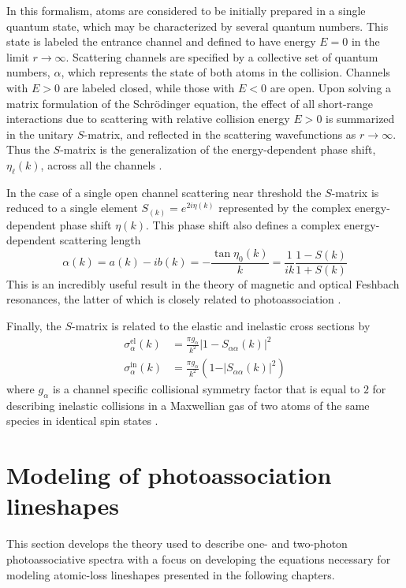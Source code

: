 In this formalism, atoms are considered to be initially prepared in a single quantum state, which may be characterized by several quantum numbers.
This state is labeled the entrance channel and defined to have energy $E=0$ in the limit $r\rightarrow\infty$.
Scattering channels are specified by a collective set of quantum numbers, $\alpha$, which represents the state of both atoms in the collision.
Channels with $E>0$ are labeled closed, while those with $E<0$ are open.
Upon solving a matrix formulation of the Schr\"{o}dinger equation, the effect of all short-range interactions due to scattering with relative collision energy $E > 0$ is summarized in the unitary $S$-matrix, and reflected in the scattering wavefunctions as $r\rightarrow\infty$. 
Thus the $S$-matrix is the generalization of the energy-dependent phase shift, $\eta_{\ell}(k)$, across all the channels \cite{Julienne2009a}.

In the case of a single open channel scattering near threshold the $S$-matrix is reduced to a single element $S_(k)=e^{2i\eta(k)}$ represented by the complex energy-dependent phase shift $\eta(k)$.
This phase shift also defines a complex energy-dependent scattering length
\begin{equation}
	\alpha(k) = a(k) - i b(k) = -\frac{\tan \eta_0(k)}{k} = \frac{1}{ik} \frac{1-S(k)}{1+S(k)}
\end{equation}
This is an incredibly useful result in the theory of magnetic and optical Feshbach resonances, the latter of which is closely related to photoassociation \cite{Chin2010,Nicholson2015a}.

Finally, the $S$-matrix is related to the elastic and inelastic cross sections by \cite{Pachomov2017}
\begingroup
\addtolength{\jot}{1em}
\begin{align}
	\sigma^{\text{el}}_{\alpha}(k) &= \frac{\pi g_{\alpha}}{k^2} \vert 1 - S_{\alpha \alpha}(k) \vert^2 \\
	\label{eq:sigin}	
	\sigma^{\text{in}}_{\alpha}(k) &= \frac{\pi g_{\alpha}}{k^2} \left( 1 - \vert S_{\alpha \alpha}(k) \vert^2 \right)
\end{align}	
\endgroup
where $g_{\alpha}$ is a channel specific collisional symmetry factor that is equal to $2$ for describing inelastic collisions in a Maxwellian gas of two atoms of the same species in identical spin states \cite{Chin2010}.


\section{Modeling of photoassociation lineshapes} \label{sec:bohn_and_julienne}
This section develops the theory used to describe one- and two-photon photoassociative spectra with a focus on developing the equations necessary for modeling atomic-loss lineshapes presented in the following chapters.

